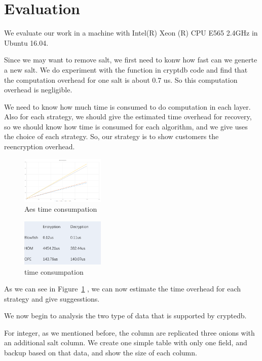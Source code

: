 \section{Evaluation}

We evaluate our work in a machine with Intel(R) Xeon (R) CPU E565 2.4GHz in Ubuntu 16.04. 


Since we may want to remove salt, we first need to konw how fast can we generte a new salt. We do experiment with the function in cryptdb code and find that the computation overhead for one salt is about 0.7 us. So this computation overhead is negligible.

We need to know how much time is consumed to do computation in each layer. Also for each strategy, we should give the estimated time overhead for recovery, so we should know how time is consumed for each algorithm, and we give uses the choice of each strategy. So, our strategy is to show customers the reencryption overhead. 


\begin{figure}[tb]
\centering
\includegraphics[width=4cm]{images/aes.png}
\caption{Aes time consumpation}
\label{fig:stack9}
\end{figure}


\begin{figure}[tb]
\centering
\includegraphics[width=4cm]{images/time.png}
\caption{time consumpation}
\label{fig:stack10}
\end{figure}

As we can see in Figure~\ref{fig:stack9} , we can now estimate the time overhead for each strategy and give suggesstions.


We now begin to analysis the two type of data that is supported by cryptedb.

For integer, as we mentioned before, the column are replicated three onions with an additional salt column. We create one simple table with only one field, and backup based on that data, and show the size of each column.


